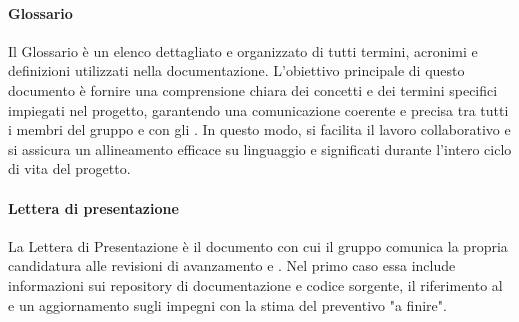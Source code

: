 \paragraph{Glossario}
Il Glossario è un elenco dettagliato e organizzato di tutti termini, acronimi e definizioni utilizzati nella documentazione. L’obiettivo principale di questo documento è fornire una comprensione chiara dei concetti e dei termini specifici impiegati nel progetto, garantendo una comunicazione coerente e precisa tra tutti i membri del gruppo e con gli . In questo modo, si facilita il lavoro collaborativo e si assicura un allineamento efficace su linguaggio e significati durante l'intero ciclo di vita del progetto.

\paragraph{Lettera di presentazione}
La Lettera di Presentazione è il documento con cui il gruppo comunica la propria candidatura alle revisioni di avanzamento  e . Nel primo caso essa include informazioni sui repository di documentazione e codice sorgente, il riferimento al  e un aggiornamento sugli impegni con la stima del preventivo "a finire". 